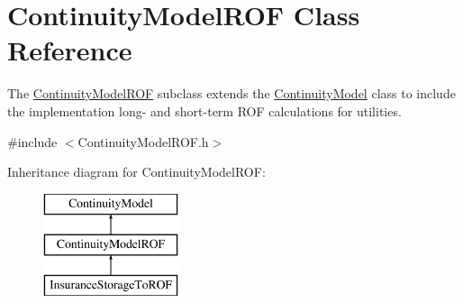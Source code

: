 \hypertarget{classContinuityModelROF}{}\section{Continuity\+Model\+R\+OF Class Reference}
\label{classContinuityModelROF}


The {\ttfamily \mbox{\hyperlink{classContinuityModelROF}{Continuity\+Model\+R\+OF}}} subclass extends the {\ttfamily \mbox{\hyperlink{classContinuityModel}{Continuity\+Model}}} class to include the implementation long-\/ and short-\/term R\+OF calculations for utilities.  




{\ttfamily \#include $<$Continuity\+Model\+R\+O\+F.\+h$>$}

Inheritance diagram for Continuity\+Model\+R\+OF\+:\begin{figure}[H]
\begin{center}
\leavevmode
\includegraphics[height=3.000000cm]{classContinuityModelROF}
\end{center}
\end{figure}
